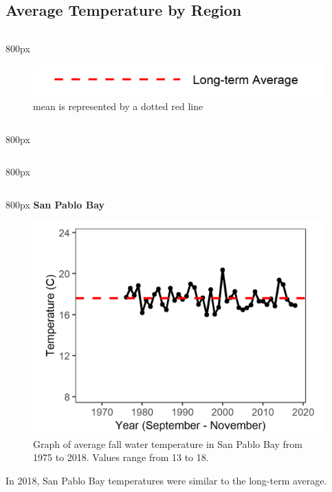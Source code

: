 \documentclass[
]{book}
\begin{document}
\hypertarget{average-temperature-by-region-2}{%
\subsection{Average Temperature by Region}\label{average-temperature-by-region-2}}

\begin{column}{800px\textwidth}
\begin{figure}
\includegraphics[width=15.25in]{figures/mline} \caption{mean is represented by a dotted red line}\label{fig:unnamed-chunk-101}
\end{figure}
\end{column}

\begin{column}{800px\textwidth}
\end{column}

\begin{column}{800px\textwidth}
\end{column}

\begin{column}{800px\textwidth}
\textbf{San Pablo Bay}

\begin{figure}
\includegraphics[width=15.25in]{figures/temp_splfall} \caption{Graph of average fall water temperature in San Pablo Bay from 1975 to 2018. Values range from 13 to 18.}\label{fig:unnamed-chunk-102}
\end{figure}

In 2018, San Pablo Bay temperatures were similar to the long-term average.
\end{column}
\end{document}
